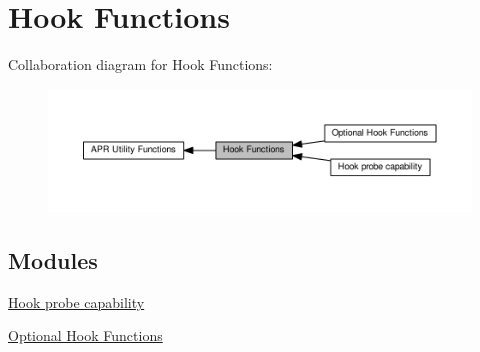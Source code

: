 \hypertarget{group__APR__Util__Hook}{}\section{Hook Functions}
\label{group__APR__Util__Hook}
Collaboration diagram for Hook Functions\+:
\nopagebreak
\begin{figure}[H]
\begin{center}
\leavevmode
\includegraphics[width=350pt]{group__APR__Util__Hook}
\end{center}
\end{figure}
\subsection*{Modules}
\begin{DoxyCompactItemize}
\item 
\hyperlink{group__apr__hook__probes}{Hook probe capability}
\item 
\hyperlink{group__APR__Util__OPT__HOOK}{Optional Hook Functions}
\end{DoxyCompactItemize}
